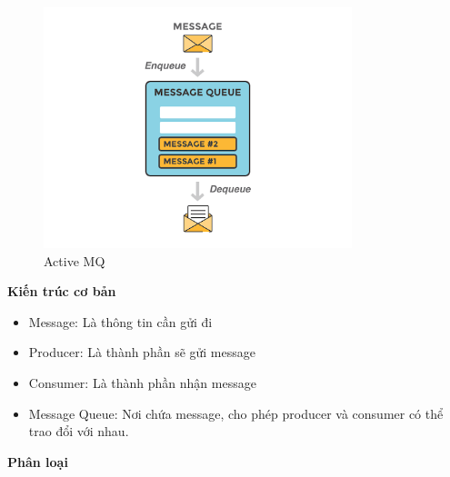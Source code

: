              \begin{figure}[H]   			\includegraphics[width=0.8\textwidth]{Images/message.png}
			\centering
			\linebreak
			\caption{Active MQ}
	        \end{figure}
		        
            \textbf{Kiến trúc cơ bản}
            
            \begin{itemize}
                \item Message: Là thông tin cần gửi đi
                \item Producer: Là thành phần sẽ gửi message
                \item Consumer: Là thành phần nhận message
                \item Message Queue: Nơi chứa message, cho phép producer và consumer có thể trao đổi với nhau.
            \end{itemize}
            
            \textbf{Phân loại}
            
